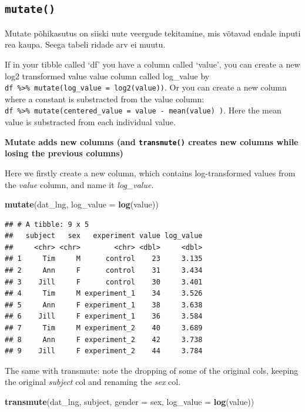 \documentclass[]{book}
\newenvironment{Shaded}{\begin{snugshade}}{\end{snugshade}}
\newcommand{\KeywordTok}[1]{\textcolor[rgb]{0.13,0.29,0.53}{\textbf{#1}}}
\newcommand{\DataTypeTok}[1]{\textcolor[rgb]{0.13,0.29,0.53}{#1}}
\newcommand{\NormalTok}[1]{#1}
\begin{document}
\subsection{\texorpdfstring{\texttt{mutate()}}{mutate()}}\label{mutate}

Mutate põhikasutus on siiski uute veergude tekitamine, mis võtavad
endale inputi rea kaupa. Seega tabeli ridade arv ei muutu.

If in your tibble called `df' you have a column called `value', you can
create a new log2 transformed value value column called log\_value by
\texttt{df\ \%\textgreater{}\%\ mutate(log\_value\ =\ log2(value))}. Or
you can create a new column where a constant is substracted from the
value column:
\texttt{df\ \%\textgreater{}\%\ mutate(centered\_value\ =\ value\ -\ mean(value)\ )}.
Here the mean value is substracted from each individual value.

\textbf{Mutate adds new columns (and \texttt{transmute()} creates new
columns while losing the previous columns)}

Here we firstly create a new column, which contains log-transformed
values from the \emph{value} column, and name it \emph{log\_value}.

\begin{Shaded}
\begin{Highlighting}[]
\KeywordTok{mutate}\NormalTok{(dat_lng, }\DataTypeTok{log_value =} \KeywordTok{log}\NormalTok{(value))}
\end{Highlighting}
\end{Shaded}

\begin{verbatim}
## # A tibble: 9 x 5
##   subject   sex   experiment value log_value
##     <chr> <chr>        <chr> <dbl>     <dbl>
## 1     Tim     M      control    23     3.135
## 2     Ann     F      control    31     3.434
## 3    Jill     F      control    30     3.401
## 4     Tim     M experiment_1    34     3.526
## 5     Ann     F experiment_1    38     3.638
## 6    Jill     F experiment_1    36     3.584
## 7     Tim     M experiment_2    40     3.689
## 8     Ann     F experiment_2    42     3.738
## 9    Jill     F experiment_2    44     3.784
\end{verbatim}

The same with transmute: note the dropping of some of the original cols,
keeping the original \emph{subject} col and renaming the \emph{sex} col.

\begin{Shaded}
\begin{Highlighting}[]
\KeywordTok{transmute}\NormalTok{(dat_lng, subject, }\DataTypeTok{gender =}\NormalTok{ sex, }\DataTypeTok{log_value =} \KeywordTok{log}\NormalTok{(value))}
\end{Highlighting}
\end{Shaded}
\end{document}
